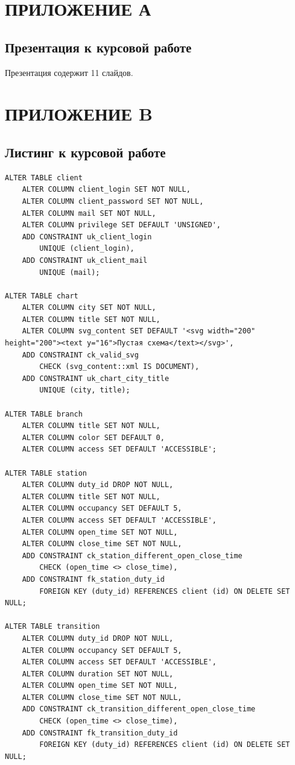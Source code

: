 \chapter*{ПРИЛОЖЕНИЕ А}

\section*{Презентация к курсовой работе}
Презентация содержит 11 слайдов.

\chapter*{ПРИЛОЖЕНИЕ B}

\section*{Листинг к курсовой работе}

\begin{lstlisting}[label=lst:cnst1,caption=Запросы для создания ограничений таблиц (часть 1)]
ALTER TABLE client
    ALTER COLUMN client_login SET NOT NULL,
    ALTER COLUMN client_password SET NOT NULL,
    ALTER COLUMN mail SET NOT NULL,
    ALTER COLUMN privilege SET DEFAULT 'UNSIGNED',
    ADD CONSTRAINT uk_client_login
        UNIQUE (client_login),
    ADD CONSTRAINT uk_client_mail
        UNIQUE (mail);

ALTER TABLE chart
    ALTER COLUMN city SET NOT NULL,
    ALTER COLUMN title SET NOT NULL,
    ALTER COLUMN svg_content SET DEFAULT '<svg width="200" height="200"><text y="16">Пустая схема</text></svg>',
    ADD CONSTRAINT ck_valid_svg
        CHECK (svg_content::xml IS DOCUMENT),
    ADD CONSTRAINT uk_chart_city_title
        UNIQUE (city, title);

ALTER TABLE branch
    ALTER COLUMN title SET NOT NULL,
    ALTER COLUMN color SET DEFAULT 0,
    ALTER COLUMN access SET DEFAULT 'ACCESSIBLE';

ALTER TABLE station
    ALTER COLUMN duty_id DROP NOT NULL,
    ALTER COLUMN title SET NOT NULL,
    ALTER COLUMN occupancy SET DEFAULT 5,
    ALTER COLUMN access SET DEFAULT 'ACCESSIBLE',
    ALTER COLUMN open_time SET NOT NULL,
    ALTER COLUMN close_time SET NOT NULL,
    ADD CONSTRAINT ck_station_different_open_close_time
        CHECK (open_time <> close_time),
    ADD CONSTRAINT fk_station_duty_id
        FOREIGN KEY (duty_id) REFERENCES client (id) ON DELETE SET NULL;

ALTER TABLE transition
    ALTER COLUMN duty_id DROP NOT NULL,
    ALTER COLUMN occupancy SET DEFAULT 5,
    ALTER COLUMN access SET DEFAULT 'ACCESSIBLE',
    ALTER COLUMN duration SET NOT NULL,
    ALTER COLUMN open_time SET NOT NULL,
    ALTER COLUMN close_time SET NOT NULL,
    ADD CONSTRAINT ck_transition_different_open_close_time
        CHECK (open_time <> close_time),
    ADD CONSTRAINT fk_transition_duty_id
        FOREIGN KEY (duty_id) REFERENCES client (id) ON DELETE SET NULL;
\end{lstlisting}

